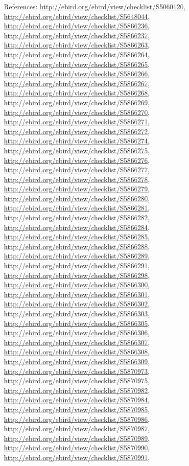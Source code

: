 \documentclass[9pt, article]{memoir}
\begin{document}
\begin{multicols}{2}
References: 
\url{http://ebird.org/ebird/view/checklist/S5060120}, 
\url{http://ebird.org/ebird/view/checklist/S5648044}, 
\url{http://ebird.org/ebird/view/checklist/S5866236}, 
\url{http://ebird.org/ebird/view/checklist/S5866237}, 
\url{http://ebird.org/ebird/view/checklist/S5866263}, 
\url{http://ebird.org/ebird/view/checklist/S5866264}, 
\url{http://ebird.org/ebird/view/checklist/S5866265}, 
\url{http://ebird.org/ebird/view/checklist/S5866266}, 
\url{http://ebird.org/ebird/view/checklist/S5866267}, 
\url{http://ebird.org/ebird/view/checklist/S5866268}, 
\url{http://ebird.org/ebird/view/checklist/S5866269}, 
\url{http://ebird.org/ebird/view/checklist/S5866270}, 
\url{http://ebird.org/ebird/view/checklist/S5866271}, 
\url{http://ebird.org/ebird/view/checklist/S5866272}, 
\url{http://ebird.org/ebird/view/checklist/S5866274}, 
\url{http://ebird.org/ebird/view/checklist/S5866275}, 
\url{http://ebird.org/ebird/view/checklist/S5866276}, 
\url{http://ebird.org/ebird/view/checklist/S5866277}, 
\url{http://ebird.org/ebird/view/checklist/S5866278}, 
\url{http://ebird.org/ebird/view/checklist/S5866279}, 
\url{http://ebird.org/ebird/view/checklist/S5866280}, 
\url{http://ebird.org/ebird/view/checklist/S5866281}, 
\url{http://ebird.org/ebird/view/checklist/S5866282}, 
\url{http://ebird.org/ebird/view/checklist/S5866284}, 
\url{http://ebird.org/ebird/view/checklist/S5866285}, 
\url{http://ebird.org/ebird/view/checklist/S5866288}, 
\url{http://ebird.org/ebird/view/checklist/S5866289}, 
\url{http://ebird.org/ebird/view/checklist/S5866291}, 
\url{http://ebird.org/ebird/view/checklist/S5866298}, 
\url{http://ebird.org/ebird/view/checklist/S5866300}, 
\url{http://ebird.org/ebird/view/checklist/S5866301}, 
\url{http://ebird.org/ebird/view/checklist/S5866302}, 
\url{http://ebird.org/ebird/view/checklist/S5866303}, 
\url{http://ebird.org/ebird/view/checklist/S5866305}, 
\url{http://ebird.org/ebird/view/checklist/S5866306}, 
\url{http://ebird.org/ebird/view/checklist/S5866307}, 
\url{http://ebird.org/ebird/view/checklist/S5866308}, 
\url{http://ebird.org/ebird/view/checklist/S5866309}, 
\url{http://ebird.org/ebird/view/checklist/S5870973}, 
\url{http://ebird.org/ebird/view/checklist/S5870975}, 
\url{http://ebird.org/ebird/view/checklist/S5870982}, 
\url{http://ebird.org/ebird/view/checklist/S5870984}, 
\url{http://ebird.org/ebird/view/checklist/S5870985}, 
\url{http://ebird.org/ebird/view/checklist/S5870986}, 
\url{http://ebird.org/ebird/view/checklist/S5870987}, 
\url{http://ebird.org/ebird/view/checklist/S5870989}, 
\url{http://ebird.org/ebird/view/checklist/S5870990}, 
\url{http://ebird.org/ebird/view/checklist/S5870991}, 

\end{multicols}
\end{document}
